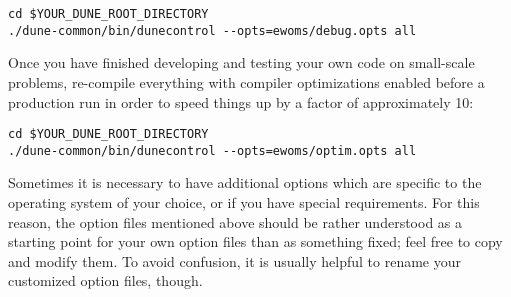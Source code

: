 \begin{lstlisting}[style=Bash]
cd $YOUR_DUNE_ROOT_DIRECTORY
./dune-common/bin/dunecontrol --opts=ewoms/debug.opts all
\end{lstlisting}

Once you have finished developing and testing your own code on
small-scale problems, re-compile everything with compiler
optimizations enabled before a production run in order to speed things
up by a factor of approximately 10:

\begin{lstlisting}[style=Bash]
cd $YOUR_DUNE_ROOT_DIRECTORY
./dune-common/bin/dunecontrol --opts=ewoms/optim.opts all
\end{lstlisting}

Sometimes it is necessary to have additional options which are
specific to the operating system of your choice, or if you have
special requirements.  For this reason, the option files mentioned
above should be rather understood as a starting point for your own
option files than as something fixed; feel free to copy and modify
them. To avoid confusion, it is usually helpful to rename your
customized option files, though.

